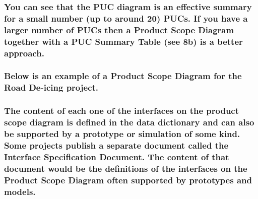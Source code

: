 \documentclass[
]{article}
\begin{document}
\hypertarget{you-can-see-that-the-puc-diagram-is-an-effective-summary-for-a-small-number-up-to-around-20-pucs.-if-you-have-a-larger-number-of-pucs-then-a-product-scope-diagram-together-with-a-puc-summary-table-see-8b-is-a-better-approach.}{%
\subsubsection{You can see that the PUC diagram is an effective summary
for a small number (up to around 20) PUCs. If you have a larger number
of PUCs then a Product Scope Diagram together with a PUC Summary Table
(see 8b) is a better
approach.}\label{you-can-see-that-the-puc-diagram-is-an-effective-summary-for-a-small-number-up-to-around-20-pucs.-if-you-have-a-larger-number-of-pucs-then-a-product-scope-diagram-together-with-a-puc-summary-table-see-8b-is-a-better-approach.}}

\hypertarget{below-is-an-example-of-a-product-scope-diagram-for-the-road-de-icing-project.}{%
\subsubsection{Below is an example of a Product Scope Diagram for the
Road De-icing
project.}\label{below-is-an-example-of-a-product-scope-diagram-for-the-road-de-icing-project.}}

\hypertarget{the-content-of-each-one-of-the-interfaces-on-the-product-scope-diagram-is-defined-in-the-data-dictionary-and-can-also-be-supported-by-a-prototype-or-simulation-of-some-kind.-some-projects-publish-a-separate-document-called-the-interface-specification-document.-the-content-of-that-document-would-be-the-definitions-of-the-interfaces-on-the-product-scope-diagram-often-supported-by-prototypes-and-models.}{%
\subsubsection{The content of each one of the interfaces on the product
scope diagram is defined in the data dictionary and can also be
supported by a prototype or simulation of some kind. Some projects
publish a separate document called the Interface Specification Document.
The content of that document would be the definitions of the interfaces
on the Product Scope Diagram often supported by prototypes and
models.}\label{the-content-of-each-one-of-the-interfaces-on-the-product-scope-diagram-is-defined-in-the-data-dictionary-and-can-also-be-supported-by-a-prototype-or-simulation-of-some-kind.-some-projects-publish-a-separate-document-called-the-interface-specification-document.-the-content-of-that-document-would-be-the-definitions-of-the-interfaces-on-the-product-scope-diagram-often-supported-by-prototypes-and-models.}}
\end{document}
